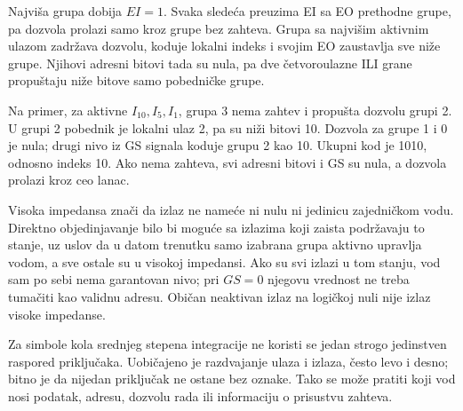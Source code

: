 
Najviša grupa dobija \(EI=1\). Svaka sledeća preuzima EI sa EO prethodne grupe, pa dozvola prolazi samo kroz grupe bez zahteva. Grupa sa najvišim aktivnim ulazom zadržava dozvolu, koduje lokalni indeks i svojim EO zaustavlja sve niže grupe. Njihovi adresni bitovi tada su nula, pa dve četvoroulazne ILI grane propuštaju niže bitove samo pobedničke grupe.

Na primer, za aktivne \(I_{10},I_5,I_1\), grupa 3 nema zahtev i propušta dozvolu grupi 2. U grupi 2 pobednik je lokalni ulaz 2, pa su niži bitovi 10. Dozvola za grupe 1 i 0 je nula; drugi nivo iz GS signala koduje grupu 2 kao 10. Ukupni kod je 1010, odnosno indeks 10. Ako nema zahteva, svi adresni bitovi i GS su nula, a dozvola prolazi kroz ceo lanac.

Visoka impedansa znači da izlaz ne nameće ni nulu ni jedinicu zajedničkom vodu. Direktno objedinjavanje bilo bi moguće sa izlazima koji zaista podržavaju to stanje, uz uslov da u datom trenutku samo izabrana grupa aktivno upravlja vodom, a sve ostale su u visokoj impedansi. Ako su svi izlazi u tom stanju, vod sam po sebi nema garantovan nivo; pri \(GS=0\) njegovu vrednost ne treba tumačiti kao validnu adresu. Običan neaktivan izlaz na logičkoj nuli nije izlaz visoke impedanse.

Za simbole kola srednjeg stepena integracije ne koristi se jedan strogo jedinstven raspored priključaka. Uobičajeno je razdvajanje ulaza i izlaza, često levo i desno; bitno je da nijedan priključak ne ostane bez oznake. Tako se može pratiti koji vod nosi podatak, adresu, dozvolu rada ili informaciju o prisustvu zahteva.
